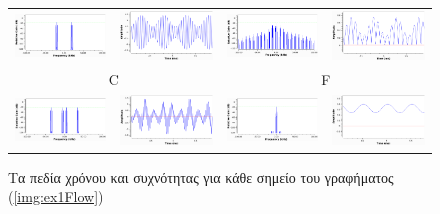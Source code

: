 \documentclass[12pt]{report}
\begin{document}
\begin{figure}[h]
\begin{tabular}{cccc}
                    \includegraphics[width=.23\linewidth]{ex1Bf.png} & \includegraphics[width=.23\linewidth]{ex1Bt.png} & \includegraphics[width=.23\linewidth]{ex1Ef.png} & \includegraphics[width=.23\linewidth]{ex1Et.png}\\
                    \multicolumn{2}{c}{C} & \multicolumn{2}{c}{F}\\
                    \includegraphics[width=.23\linewidth]{ex1Cf.png} & \includegraphics[width=.23\linewidth]{ex1Ct.png} & \includegraphics[width=.23\linewidth]{ex1Ff.png} & \includegraphics[width=.23\linewidth]{ex1Ft.png}
                \end{tabular}
                \caption{Τα πεδία χρόνου και συχνότητας για κάθε σημείο του γραφήματος (\ref{img:ex1Flow})}
                \label{img:timefreq}
            \end{figure}
        
\end{document}
